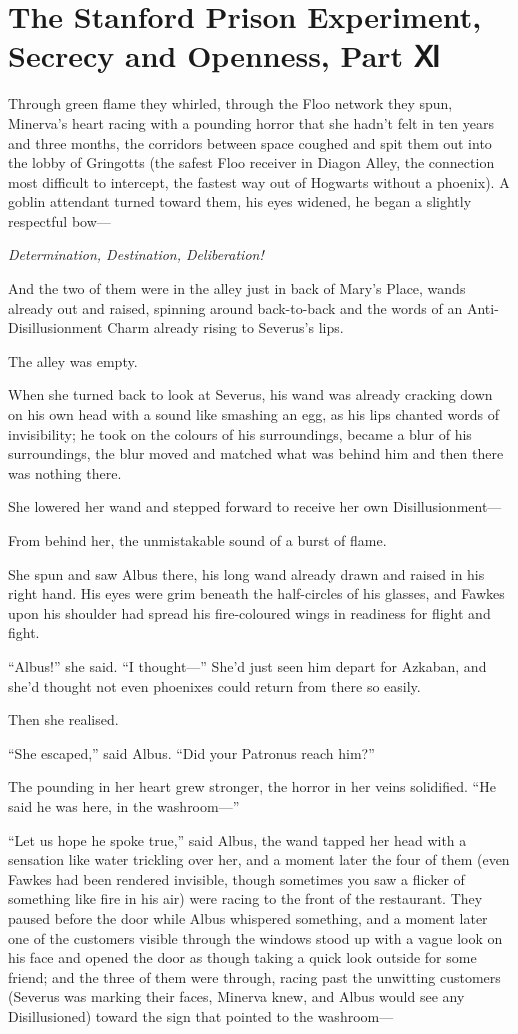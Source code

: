 \chapter{The Stanford Prison Experiment, Secrecy and Openness, Part Ⅺ}

Through green flame they whirled, through the Floo network they spun,
Minerva's heart racing with a pounding horror that she hadn't felt in
ten years and three months, the corridors between space coughed and spit
them out into the lobby of Gringotts (the safest Floo receiver in Diagon
Alley, the connection most difficult to intercept, the fastest way out
of Hogwarts without a phoenix). A goblin attendant turned toward them,
his eyes widened, he began a slightly respectful bow---

\emph{Determination, Destination, Deliberation!}

And the two of them were in the alley just in back of Mary's Place,
wands already out and raised, spinning around back-to-back and the words
of an Anti-Disillusionment Charm already rising to Severus's lips.

The alley was empty.

When she turned back to look at Severus, his wand was already cracking
down on his own head with a sound like smashing an egg, as his lips
chanted words of invisibility; he took on the colours of his
surroundings, became a blur of his surroundings, the blur moved and
matched what was behind him and then there was nothing there.

She lowered her wand and stepped forward to receive her own
Disillusionment---

From behind her, the unmistakable sound of a burst of flame.

She spun and saw Albus there, his long wand already drawn and raised in
his right hand. His eyes were grim beneath the half-circles of his
glasses, and Fawkes upon his shoulder had spread his fire-coloured wings
in readiness for flight and fight.

``Albus!'' she said. ``I thought---'' She'd just seen him depart for
Azkaban, and she'd thought not even phoenixes could return from there so
easily.

Then she realised.

``She escaped,'' said Albus. ``Did your Patronus reach him?''

The pounding in her heart grew stronger, the horror in her veins
solidified. ``He said he was here, in the washroom---''

``Let us hope he spoke true,'' said Albus, the wand tapped her head with
a sensation like water trickling over her, and a moment later the four
of them (even Fawkes had been rendered invisible, though sometimes you
saw a flicker of something like fire in his air) were racing to the
front of the restaurant. They paused before the door while Albus
whispered something, and a moment later one of the customers visible
through the windows stood up with a vague look on his face and opened
the door as though taking a quick look outside for some friend; and the
three of them were through, racing past the unwitting customers (Severus
was marking their faces, Minerva knew, and Albus would see any
Disillusioned) toward the sign that pointed to the washroom---

